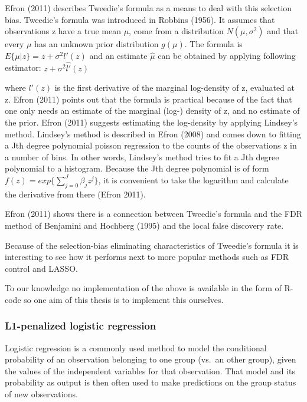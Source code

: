 \documentclass[
]{article}
\begin{document}
Efron (2011) describes Tweedie's formula as a means to deal with this selection bias. Tweedie's formula was introduced in Robbins (1956). It assumes that observations z have a true mean \(\mu\), come from a distribution \(N(\mu,\sigma^2)\) and that every \(\mu\) has an unknown prior distribution \(g(\mu)\). The formula is \(E\{\mu|z\} = z + \sigma^2l'(z)\) and an estimate \(\hat{\mu}\) can be obtained by applying following estimator: \(z + \sigma^2\hat{l'}(z)\)

where \(l'(z)\) is the first derivative of the marginal log-density of z, evaluated at z. Efron (2011) points out that the formula is practical because of the fact that one only needs an estimate of the marginal (log-) density of z, and no estimate of the prior. Efron (2011) suggests estimating the log-density by applying Lindsey's method. Lindsey's method is described in Efron (2008) and comes down to fitting a Jth degree polynomial poisson regression to the counts of the observations z in a number of bins. In other words, Lindsey's method tries to fit a Jth degree polynomial to a histogram. Because the Jth degree polynomial is of form \(f(z) = exp\{\sum^J_{j=0}\beta_jz^j\}\), it is convenient to take the logarithm and calculate the derivative from there (Efron 2011).

Efron (2011) shows there is a connection between Tweedie's formula and the FDR method of Benjamini and Hochberg (1995) and the local false discovery rate.

Because of the selection-bias eliminating characteristics of Tweedie's formula it is interesting to see how it performs next to more popular methods such as FDR control and LASSO.

To our knowledge no implementation of the above is available in the form of R-code so one aim of this thesis is to implement this ourselves.

\hypertarget{intro-LASSO}{%
\subsubsection{L1-penalized logistic regression}\label{intro-LASSO}}

Logistic regression is a commonly used method to model the conditional probability of an observation belonging to one group (vs.~an other group), given the values of the independent variables for that observation. That model and its probability as output is then often used to make predictions on the group status of new observations.
\end{document}
